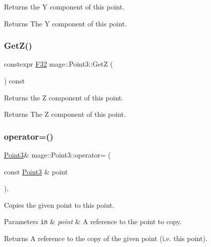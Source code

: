 Returns the Y component of this point.

\begin{DoxyReturn}{Returns}
The Y component of this point. 
\end{DoxyReturn}
\mbox{\label{structmage_1_1_point3_a9dd6e12e7c66eb8b3ab8de6cfa13d612}} 
\subsubsection{\texorpdfstring{Get\+Z()}{GetZ()}}
{\footnotesize\ttfamily constexpr \mbox{\hyperlink{namespacemage_aa97e833b45f06d60a0a9c4fc22ae02c0}{F32}} mage\+::\+Point3\+::\+GetZ (\begin{DoxyParamCaption}{ }\end{DoxyParamCaption}) const\hspace{0.3cm}{\ttfamily [noexcept]}}

Returns the Z component of this point.

\begin{DoxyReturn}{Returns}
The Z component of this point. 
\end{DoxyReturn}
\mbox{\label{structmage_1_1_point3_aaf94d246281f433cdbd1391bfedc55cb}} 
\subsubsection{\texorpdfstring{operator=()}{operator=()}\hspace{0.1cm}{\footnotesize\ttfamily [1/2]}}
{\footnotesize\ttfamily \mbox{\hyperlink{structmage_1_1_point3}{Point3}}\& mage\+::\+Point3\+::operator= (\begin{DoxyParamCaption}\item[{const \mbox{\hyperlink{structmage_1_1_point3}{Point3}} \&}]{point }\end{DoxyParamCaption})\hspace{0.3cm}{\ttfamily [default]}, {\ttfamily [noexcept]}}

Copies the given point to this point.


\begin{DoxyParams}[1]{Parameters}
\mbox{\tt in}  & {\em point} & A reference to the point to copy. \\
\hline
\end{DoxyParams}
\begin{DoxyReturn}{Returns}
A reference to the copy of the given point (i.\+e. this point). 
\end{DoxyReturn}
\mbox{\label{structmage_1_1_point3_a37ccf01cf7b610d4b17aa7a7888a443c}} 

